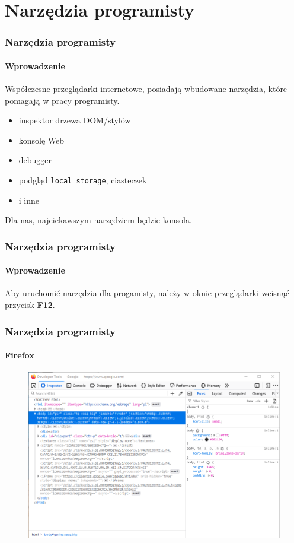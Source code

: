 \section{Narzędzia programisty}

\begin{frame}[fragile]
  \frametitle{Narzędzia programisty}
  \framesubtitle{Wprowadzenie}

  Współczesne przeglądarki internetowe, posiadają wbudowane narzędzia, które pomagają w pracy programisty.

  \begin{itemize}
    \item inspektor drzewa DOM/stylów
    \item konsolę Web
    \item debugger
    \item podgląd \verb|local storage|, ciasteczek
    \item i inne
  \end{itemize}

  Dla nas, najciekawszym narzędziem będzie konsola.
\end{frame}


\begin{frame}[fragile]
  \frametitle{Narzędzia programisty}
  \framesubtitle{Wprowadzenie}

  Aby uruchomić narzędzia dla progamisty, należy w oknie przeglądarki wcisnąć przycisk \textbf{F12}.
\end{frame}


\begin{frame}[fragile]
  \frametitle{Narzędzia programisty}
  \framesubtitle{Firefox}

  \begin{figure}
    \includegraphics[scale=0.45]{images/dev-tools-firefox}
  \end{figure}

\end{frame}


